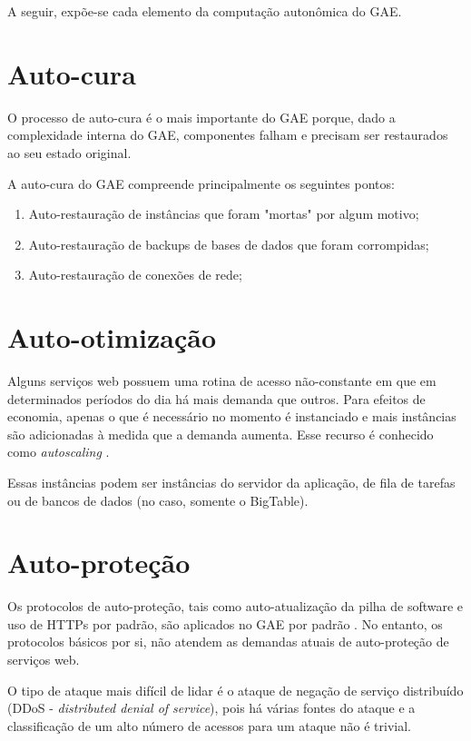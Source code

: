 \documentclass[12pt]{article}
\begin{document}
A seguir, expõe-se cada elemento da computação autonômica do GAE.

\section{Auto-cura}

O processo de auto-cura é o mais importante do GAE porque, dado a complexidade
interna do GAE, componentes falham e precisam ser restaurados ao seu estado
original.

A auto-cura do GAE compreende principalmente os seguintes pontos:

\begin{enumerate}
    \item Auto-restauração de instâncias que foram "mortas" por algum motivo;
    \item Auto-restauração de backups de bases de dados que foram corrompidas;
    \item Auto-restauração de conexões de rede;
\end{enumerate}

\section{Auto-otimização}

Alguns serviços web possuem uma rotina de acesso não-constante em que em
determinados períodos do dia há mais demanda que outros. Para efeitos de
economia, apenas o que é necessário no momento é instanciado e mais instâncias
são adicionadas à medida que a demanda aumenta. Esse recurso é conhecido como
\textit{autoscaling} \cite{autoscaling}.

Essas instâncias podem ser instâncias do servidor da aplicação, de fila de
tarefas ou de bancos de dados (no caso, somente o BigTable).


\section{Auto-proteção}

Os protocolos de auto-proteção, tais como auto-atualização da pilha de software
e uso de HTTPs por padrão, são aplicados no GAE por padrão \cite{whitepaper}. No entanto, os
protocolos básicos por si, não atendem as demandas atuais de auto-proteção de
serviços web.

O tipo de ataque mais difícil de lidar é o ataque de negação de serviço
distribuído (DDoS - \textit{distributed denial of service}), pois há várias
fontes do ataque e a classificação de um alto número de acessos para um ataque
não é trivial.
\end{document}
